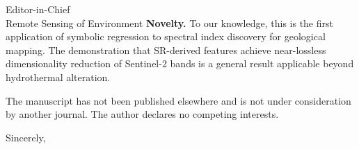 \documentclass[11pt]{letter}
\begin{document}
\begin{letter}{Editor-in-Chief\\Remote Sensing of Environment}
\textbf{Novelty.} To our knowledge, this is the first application of symbolic regression to spectral index discovery for geological mapping. The demonstration that SR-derived features achieve near-lossless dimensionality reduction of Sentinel-2 bands is a general result applicable beyond hydrothermal alteration.

The manuscript has not been published elsewhere and is not under consideration by another journal. The author declares no competing interests.

\closing{Sincerely,}

\end{letter}
\end{document}
